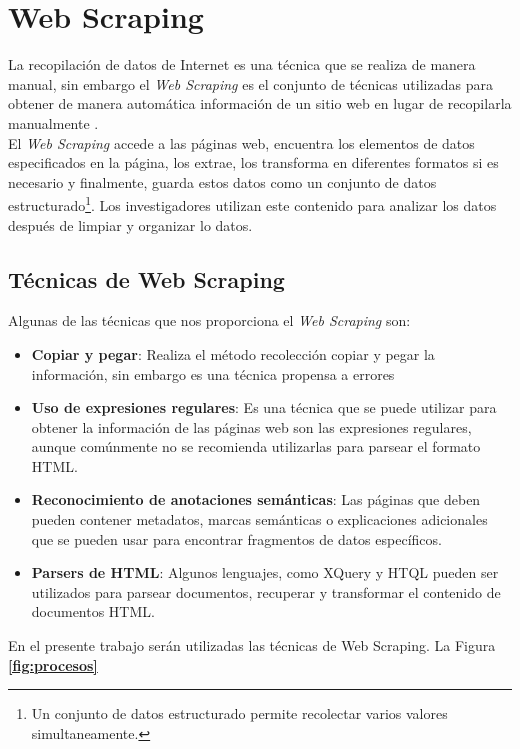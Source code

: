 

\section{Web Scraping}
La recopilación de datos de Internet es una técnica que se realiza de manera manual, sin embargo 
el \textit{Web Scraping} es el conjunto de técnicas utilizadas para obtener de manera automática información de 
un sitio web en lugar de recopilarla manualmente \citep{CTWebScraping}. 
\\
El \textit{Web Scraping} accede a las páginas web, encuentra los elementos de datos especificados en la 
página, los extrae, los transforma en diferentes formatos si es necesario y finalmente, guarda 
estos datos como un conjunto de datos estructurado\footnote{Un conjunto de datos estructurado permite recolectar 
varios valores simultaneamente.}. Los investigadores utilizan este contenido para analizar los datos 
después de limpiar y organizar lo datos.
\subsection{Técnicas de Web Scraping}

Algunas de las técnicas que nos proporciona el \textit{Web Scraping} son\citep{CTTechniques}:
\begin{itemize}
    \item \textbf{Copiar y pegar}: Realiza el método recolección copiar y pegar la información, 
    sin embargo es una técnica propensa a errores
    \item \textbf{Uso de expresiones regulares}: Es una técnica que se puede utilizar para obtener la información 
    de las páginas web son las expresiones regulares, aunque comúnmente no se recomienda utilizarlas para parsear el formato HTML.
    \item \textbf{Reconocimiento de anotaciones semánticas}: Las páginas que deben pueden contener metadatos, 
    marcas semánticas o explicaciones adicionales que se pueden usar para encontrar fragmentos de datos específicos.
    \item \textbf{Parsers de HTML}: Algunos lenguajes, como XQuery y HTQL pueden ser utilizados para parsear documentos, recuperar 
    y transformar el contenido de documentos HTML.
\end{itemize}
En el presente trabajo serán utilizadas las técnicas de Web Scraping.
La Figura \textbf{\ref{fig:procesos}}

